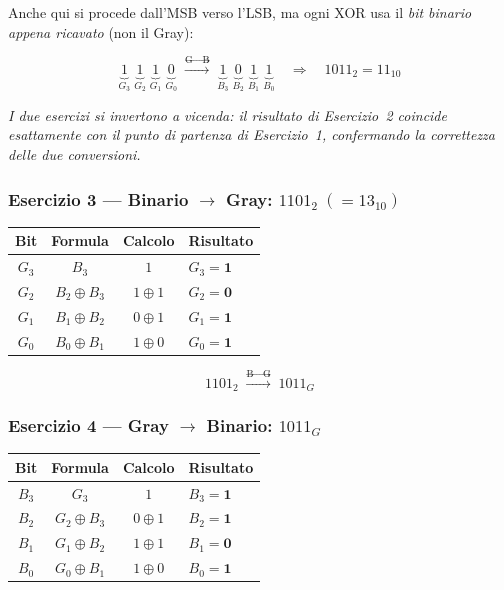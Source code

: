 \documentclass[11pt,a4paper]{report}
\begin{document}
\medskip
\noindent Anche qui si procede dall'MSB verso l'LSB, ma ogni XOR usa il \emph{bit binario appena ricavato} (non il Gray):

\[
\underbrace{1}_{G_3}\;\underbrace{1}_{G_2}\;\underbrace{1}_{G_1}\;\underbrace{0}_{G_0}
\;\xrightarrow{\text{G}\to\text{B}}\;
\underbrace{1}_{B_3}\;\underbrace{0}_{B_2}\;\underbrace{1}_{B_1}\;\underbrace{1}_{B_0}
\quad\Rightarrow\quad \boxed{1011_2 = 11_{10}}
\]

\vspace{0.5em}
\noindent\textit{I due esercizi si invertono a vicenda: il risultato di Esercizio~2 coincide esattamente con il punto di partenza di Esercizio~1, confermando la correttezza delle due conversioni.}

\vspace{1.5em}

\subsubsection*{Esercizio 3 — Binario $\to$ Gray: \quad $1101_2 \;(=13_{10})$}

\medskip
\begin{center}
\begin{tabular}{c|c|c|l}
\toprule
Bit & Formula & Calcolo & Risultato\\
\midrule
$G_3$ & $B_3$ & $1$ & $G_3 = \mathbf{1}$ \\
$G_2$ & $B_2 \oplus B_3$ & $1 \oplus 1$ & $G_2 = \mathbf{0}$ \\
$G_1$ & $B_1 \oplus B_2$ & $0 \oplus 1$ & $G_1 = \mathbf{1}$ \\
$G_0$ & $B_0 \oplus B_1$ & $1 \oplus 0$ & $G_0 = \mathbf{1}$ \\
\bottomrule
\end{tabular}
\end{center}

\[
1101_2 \;\xrightarrow{\text{B}\to\text{G}}\; \boxed{1011_G}
\]

\subsubsection*{Esercizio 4 — Gray $\to$ Binario: \quad $1011_G$}

\medskip
\begin{center}
\begin{tabular}{c|c|c|l}
\toprule
Bit & Formula & Calcolo & Risultato\\
\midrule
$B_3$ & $G_3$ & $1$ & $B_3 = \mathbf{1}$ \\
$B_2$ & $G_2 \oplus B_3$ & $0 \oplus 1$ & $B_2 = \mathbf{1}$ \\
$B_1$ & $G_1 \oplus B_2$ & $1 \oplus 1$ & $B_1 = \mathbf{0}$ \\
$B_0$ & $G_0 \oplus B_1$ & $1 \oplus 0$ & $B_0 = \mathbf{1}$ \\
\bottomrule
\end{tabular}
\end{center}
\end{document}
